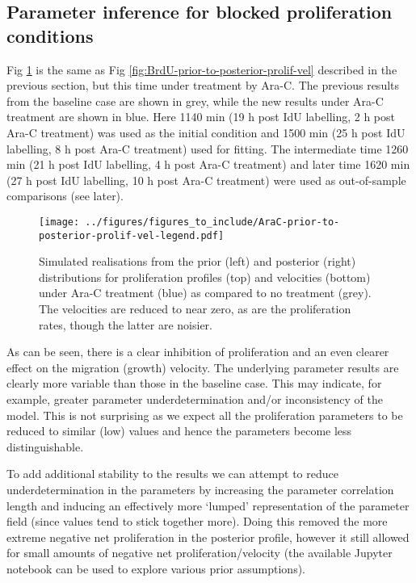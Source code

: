 \documentclass[10pt,letterpaper]{article}
\begin{document}
\subsection{Parameter inference for blocked proliferation
conditions}\label{parameter-inference-for-blocked-proliferation-conditions}

Fig \ref{fig:AraC-prior-to-posterior-prolif-vel} is the same as Fig
\ref{fig:BrdU-prior-to-posterior-prolif-vel} described in the previous
section, but this time under treatment by Ara-C. The previous results
from the baseline case are shown in grey, while the new results under
Ara-C treatment are shown in blue. Here 1140 min (19 h post IdU
labelling, 2 h post Ara-C treatment) was used as the initial condition
and 1500 min (25 h post IdU labelling, 8 h post Ara-C treatment) used
for fitting. The intermediate time 1260 min (21 h post IdU labelling, 4
h post Ara-C treatment) and later time 1620 min (27 h post IdU
labelling, 10 h post Ara-C treatment) were used as out-of-sample
comparisons (see later).

\begin{figure}
\centering
\texttt{[image: ../figures/figures\_to\_include/AraC-prior-to-posterior-prolif-vel-legend.pdf]}
\caption{Simulated realisations from the prior (left) and posterior
(right) distributions for proliferation profiles (top) and velocities
(bottom) under Ara-C treatment (blue) as compared to no treatment
(grey). The velocities are reduced to near zero, as are the
proliferation rates, though the latter are
noisier.\label{fig:AraC-prior-to-posterior-prolif-vel}}
\end{figure}

As can be seen, there is a clear inhibition of proliferation and an even
clearer effect on the migration (growth) velocity. The underlying
parameter results are clearly more variable than those in the baseline
case. This may indicate, for example, greater parameter
underdetermination and/or inconsistency of the model. This is not
surprising as we expect all the proliferation parameters to be reduced
to similar (low) values and hence the parameters become less
distinguishable.

To add additional stability to the results we can attempt to reduce
underdetermination in the parameters by increasing the parameter
correlation length and inducing an effectively more `lumped'
representation of the parameter field (since values tend to stick
together more). Doing this removed the more extreme negative net
proliferation in the posterior profile, however it still allowed for
small amounts of negative net proliferation/velocity (the available
Jupyter notebook can be used to explore various prior assumptions).
\end{document}
